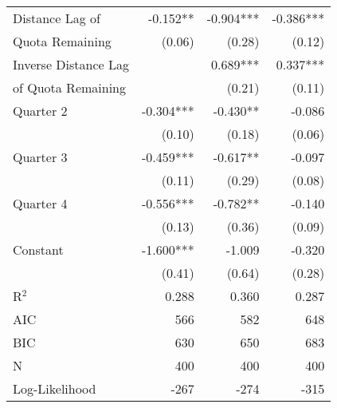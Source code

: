 {\begin{tabular}{l*{3}{r}}
Distance Lag of     &      -0.152** &      -0.904***&      -0.386***\\
Quota Remaining     &      (0.06)   &      (0.28)   &      (0.12)   \\
Inverse Distance Lag&               &       0.689***&       0.337***\\
of Quota Remaining  &               &      (0.21)   &      (0.11)   \\
Quarter 2           &      -0.304***&      -0.430** &      -0.086   \\
                    &      (0.10)   &      (0.18)   &      (0.06)   \\
Quarter 3           &      -0.459***&      -0.617** &      -0.097   \\
                    &      (0.11)   &      (0.29)   &      (0.08)   \\
Quarter 4           &      -0.556***&      -0.782** &      -0.140   \\
                    &      (0.13)   &      (0.36)   &      (0.09)   \\
Constant               &      -1.600***&      -1.009   &      -0.320   \\
                    &      (0.41)   &      (0.64)   &      (0.28)   \\
\hline
R$^2$                  &       0.288   &       0.360   &       0.287   \\
AIC                 &         566   &         582   &         648   \\
BIC                 &         630   &         650   &         683   \\
N                   &         400   &         400   &         400   \\
Log-Likelihood                  &        -267   &        -274   &        -315   \\
\hline\hline
\end{tabular}
}
